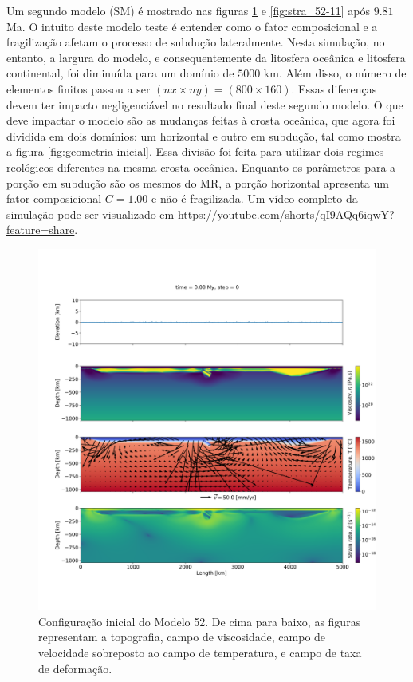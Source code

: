 Um segundo modelo (SM) é mostrado nas figuras \ref{fig:stra_52-00} e \ref{fig:stra_52-11} após $9.81$ Ma. O intuito deste modelo teste é entender como o fator composicional e a fragilização afetam o processo de subdução lateralmente. Nesta simulação, no entanto, a largura do modelo, e consequentemente da litosfera oceânica e litosfera continental, foi diminuída para um domínio de $5000$ km. Além disso, o número de elementos finitos passou a ser $(nx\times ny)=(800\times 160)$. Essas diferenças devem ter impacto negligenciável no resultado final deste segundo modelo. O que deve impactar o modelo são as mudanças feitas à crosta oceânica, que agora foi dividida em dois domínios: um horizontal e outro em subdução, tal como mostra a figura \ref{fig:geometria-inicial}. Essa divisão foi feita para utilizar dois regimes reológicos diferentes na mesma crosta oceânica. Enquanto os parâmetros para a porção em subdução são os mesmos do MR, a porção horizontal apresenta um fator composicional $C=1.00$ e não é fragilizada. Um vídeo completo da simulação pode ser visualizado em \url{https://youtube.com/shorts/qI9AQq6iqwY?feature=share}.

\begin{figure}
    \centering
    \includegraphics[trim={1.5cm 3.5cm 0.0cm 4cm}, clip, width=1.0 \textwidth]{fig/strak_52-00.png}
    \caption{Configuração inicial do Modelo 52. De cima para baixo, as figuras representam a topografia, campo de viscosidade, campo de velocidade sobreposto ao campo de temperatura, e campo de taxa de deformação.}
    \label{fig:stra_52-00}
\end{figure}

